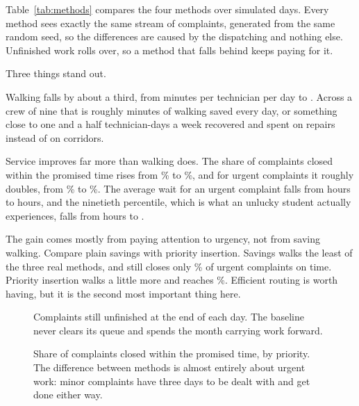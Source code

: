\documentclass[11pt]{article}
\newcommand{\figbox}[2]{%
  \begin{figure}[t]\centering
  \resizebox{\linewidth}{!}{}
  \caption{#2}\label{fig:#1}\end{figure}}
\begin{document}
Table~\ref{tab:methods} compares the four methods over \NDays{} simulated
days. Every method sees exactly the same stream of complaints, generated from
the same random seed, so the differences are caused by the dispatching and
nothing else. Unfinished work rolls over, so a method that falls behind keeps
paying for it.

\begin{table}[h]\centering\small

\caption{The four methods over \NDays{} days, on an identical stream of
complaints. ``Late hours'' is the weighted lateness that the objective adds
up; ``avg waiting'' is the average number of complaints still unfinished at
the end of a day.}
\label{tab:methods}
\end{table}

Three things stand out.

Walking falls by about a third, from \NFifoTravel{} minutes per technician per
day to \NImpTravel. Across a crew of nine that is roughly
\NWalkSavedPerDay{} minutes of walking saved every day, or something close to
one and a half technician-days a week recovered and spent on repairs instead
of on corridors.

Service improves far more than walking does. The share of complaints closed
within the promised time rises from \NFifoSla\% to \NImpSla\%, and for urgent
complaints it roughly doubles, from \NFifoUrgent\% to \NImpUrgent\%. The
average wait for an urgent complaint falls from \NFifoUrgentWait{} hours to
\NImpUrgentWait{} hours, and the ninetieth percentile, which is what an
unlucky student actually experiences, falls from \NFifoUrgentNinety{} hours to
\NImpUrgentNinety.

The gain comes mostly from paying attention to urgency, not from saving
walking. Compare plain savings with priority insertion. Savings walks the
least of the three real methods, and still closes only \NSavUrgent\% of
urgent complaints on time. Priority insertion walks a little more and reaches
\NPriUrgent\%. Efficient routing is worth having, but it is the second most
important thing here.

\figbox{backlog}{Complaints still unfinished at the end of each day. The
baseline never clears its queue and spends the month carrying work forward.}

\figbox{sla}{Share of complaints closed within the promised time, by priority.
The difference between methods is almost entirely about urgent work: minor
complaints have three days to be dealt with and get done either way.}
\end{document}
